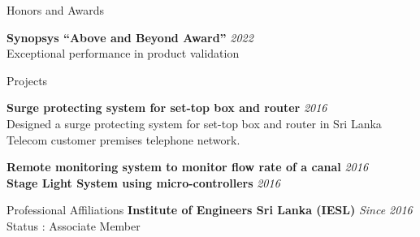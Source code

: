 \documentclass[
11pt, %
]{./assets/resume} %
\begin{document}


\begin{rSection}{Honors and Awards}

	\textbf{Synopsys “Above and Beyond Award”} \hfill \textit{2022}\\
	Exceptional performance in product validation


\end{rSection}

\begin{rSection}{Projects}

	
	\textbf{Surge protecting system for set-top box and router} \hfill \textit{2016}\\
	Designed a surge protecting system for set-top box and router in Sri Lanka Telecom customer premises telephone network.

	\textbf{Remote monitoring system to monitor flow rate of a canal} \hfill \textit{2016}\\

	\textbf{Stage Light System using micro-controllers} \hfill \textit{2016}\\

\end{rSection}

\begin{rSection}{Professional Affiliations}
	\textbf{Institute of Engineers Sri Lanka (IESL)} \hfill \textit{Since 2016}\\
	Status : Associate Member
	
\end{rSection}
\end{document}
